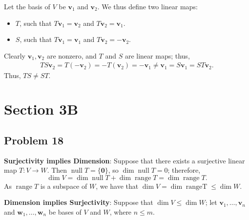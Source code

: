 \documentclass[11pt]{article}
\renewcommand{\vec}[1]{\mathbf{#1}}
\begin{document}
Let the basis of $V$ be $\vec{v}_{1}$ and $\vec{v}_{2}$. We thus define two linear maps:
\begin{itemize}
	\item $T$, such that $T \vec{v}_{1} = \vec{v}_{2}$ and $T \vec{v}_{2} = \vec{v}_{1}$.
	\item $S$, such that $T \vec{v}_{1} = \vec{v}_{1}$ and $T \vec{v}_{2} = - \vec{v}_{2}$.
\end{itemize}
Clearly $\vec{v}_{1}, \vec{v}_{2}$ are nonzero, and $T$ and $S$ are linear maps; thus,
\begin{align*}
	TS \vec{v}_{2} = T(-\vec{v}_{2}) = -T(\vec{v}_{2}) = - \vec{v}_{1} \ne \vec{v}_{1} = S \vec{v}_{1} = ST \vec{v}_{2}.
\end{align*}
Thus, $TS \ne ST$.


\section{Section 3B}


\subsection{Problem 18}

\textbf{Surjectivity implies Dimension}: Suppose that there exists a surjective linear map $T : V \to W$. Then $\operatorname{null} T = \{  \vec{0} \}$, so $\dim \operatorname{null} T = 0$; therefore,
\[
	\dim V = \dim \operatorname{null} T + \dim \operatorname{range} T = \dim \operatorname{range} T.
\]
As $\operatorname{range} T$ is a subspace of $W$, we have that $\dim V = \dim \operatorname{range T} \le \dim W$.

\textbf{Dimension implies Surjectivity}: Suppose that $\dim V \le \dim W$; let $\vec{v}_{1}, \ldots, \vec{v}_{n}$ and $\vec{w}_{1}, \ldots, \vec{w}_{n}$ be bases of $V$ and $W$, where $n \le m$.
\end{document}
